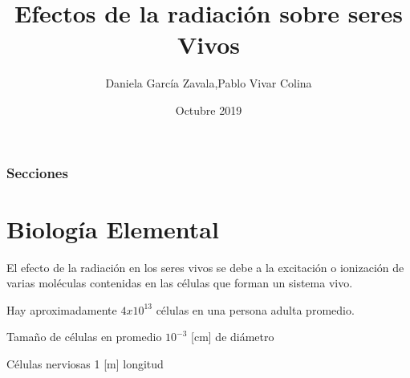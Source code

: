 \documentclass{beamer}
\title[Radiación en seres vivos]{Efectos de la radiación sobre seres Vivos} %
\author{Daniela García Zavala,Pablo Vivar Colina} %
\institute[UNAM] %
{
Facultad de Ingeniería de la Universidad Nacional Autónoma de México \\ %
\medskip
\textit{dani.g.z-95@comunidad.unam.mx\\
pvivar@idea161.org} %
}
\date{Octubre 2019}
\begin{document}
\begin{frame}
\titlepage %
\end{frame}

\begin{frame}
\frametitle{Secciones} %
\tableofcontents %
\end{frame}






\section{Biología Elemental}

\begin{frame}

  \begin{block}{}
	El efecto de la radiación en los seres vivos se debe a la excitación o ionización de varias moléculas contenidas en las células que forman un sistema vivo.\\
  \end{block}

  \begin{block}{}
	Hay aproximadamente $4 x 10^{13}$ células en una persona adulta promedio.
  \end{block}

  \begin{block}{Tamaño de células en promedio}
	$10^{-3}$ [cm] de diámetro
  \end{block}

  \begin{block}{Células nerviosas}
	1 [m] longitud
  \end{block}

\end{frame}
\end{document}
